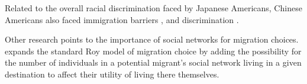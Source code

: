 Related to the overall racial discrimination faced by Japanese Americans,
Chinese Americans also faced immigration barriers
\citep{chenImpactSkillBasedImmigration2015},
and discrimination
\citep{chenInstitutionalDiscriminationAssimilation2024}.

Other research points to the importance of social networks for migration choices.
\cite{munshiSocialNetworksMigration2020}
expands the standard Roy model of migration choice
\citep{royThoughtsDistributionEarnings1951}
by adding the possibility for the number of individuals in a potential migrant's
social network living in a given destination to affect their utility
of living there themselves.

